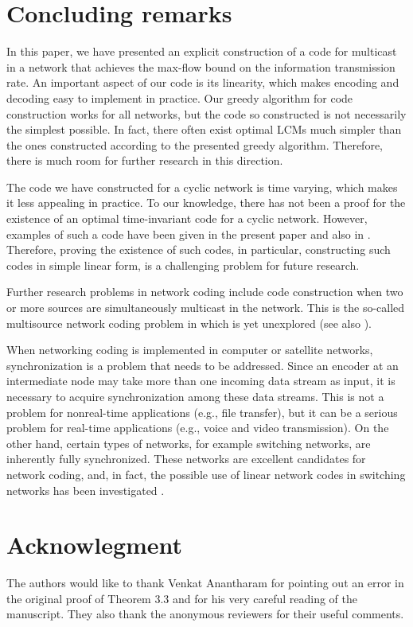 \documentclass[journal]{IEEEtran}
\begin{document}
\section{Concluding remarks}\label{sec:concluding}
\par
In this paper, we have presented an explicit construction of a code for multicast in a network that achieves the max-flow bound on the information transmission rate. An important aspect of our code is its linearity, which makes encoding and decoding easy to implement in practice. Our greedy algorithm for code construction works for all networks, but the code so constructed is not necessarily the simplest possible. In fact, there often exist optimal LCMs much simpler than the ones constructed according to the presented greedy algorithm. Therefore, there is much room for further research in this direction.
\par
The code we have constructed for a cyclic network is time varying, which makes it less appealing in practice. To our knowledge, there has not been a proof for the existence of an optimal time-invariant code for a cyclic network. However, examples of such a code have been given in the present paper and also in \cite{RNSNetwork}. Therefore, proving the existence of such codes, in particular, constructing such codes in simple linear form, is a challenging problem for future research.
\par
Further research problems in network coding include code construction when two or more sources are simultaneously multicast in the network. This is the so-called multisource network coding problem in \cite{RNSNetwork} which is yet unexplored (see also \cite{YeungA}).
\par
When networking coding is implemented in computer or satellite networks, synchronization is a problem that needs to be addressed. Since an encoder at an intermediate node may take more than one incoming data stream as input, it is necessary to acquire synchronization among these data streams. This is not a problem for nonreal-time applications (e.g., file transfer), but it can be a serious problem for real-time applications (e.g., voice and video transmission). On the other hand, certain types of networks, for example switching networks, are inherently fully synchronized. These networks are excellent candidates for network coding, and, in fact, the possible use of linear network codes in switching networks has been investigated \cite{FRp}.

\section*{Acknowlegment}
The authors would like to thank Venkat Anantharam for pointing out an error in the original proof of Theorem 3.3 and for his very careful reading of the manuscript. They also thank the anonymous reviewers for their useful comments.
  
\end{document}
